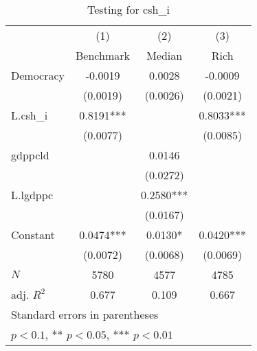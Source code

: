 \begin{table}[htbp]\centering
\def\sym#1{\ifmmode^{#1}\else\(^{#1}\)\fi}
\caption{Testing for csh\_i \label{tab:regression2}}
\begin{tabular}{l*{3}{c}}
\hline\hline
            &\multicolumn{1}{c}{(1)}&\multicolumn{1}{c}{(2)}&\multicolumn{1}{c}{(3)}\\
            &\multicolumn{1}{c}{Benchmark}&\multicolumn{1}{c}{Median}&\multicolumn{1}{c}{Rich}\\
\hline
Democracy   &     -0.0019   &      0.0028   &     -0.0009   \\
            &    (0.0019)   &    (0.0026)   &    (0.0021)   \\
[1em]
L.csh\_i     &      0.8191***&               &      0.8033***\\
            &    (0.0077)   &               &    (0.0085)   \\
[1em]
gdppcld     &               &      0.0146   &               \\
            &               &    (0.0272)   &               \\
[1em]
L.lgdppc    &               &      0.2580***&               \\
            &               &    (0.0167)   &               \\
[1em]
Constant    &      0.0474***&      0.0130*  &      0.0420***\\
            &    (0.0072)   &    (0.0068)   &    (0.0069)   \\
\hline
\(N\)       &        5780   &        4577   &        4785   \\
adj. \(R^{2}\)&       0.677   &       0.109   &       0.667   \\
\hline\hline
\multicolumn{4}{l}{\footnotesize Standard errors in parentheses}\\
\multicolumn{4}{l}{\footnotesize * \(p<0.1\), ** \(p<0.05\), *** \(p<0.01\)}\\
\end{tabular}
\end{table}
